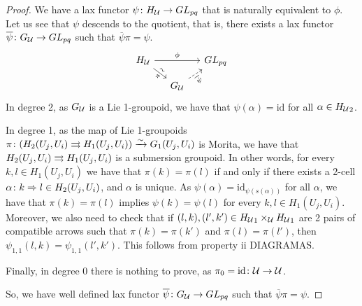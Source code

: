 \begin{proof}
We have a lax functor $\psi\colon H_{\mathcal{U}}\to GL_{pq}$ that is naturally equivalent to $\phi$.
Let us see that $\psi$ descends to the quotient, that is, there exists a lax functor $\overline\psi\colon G_{\mathcal{U}}\to GL_{pq}$ such that $\overline\psi\pi=\psi$.
\begin{equation}
\begin{tikzcd}[sep = small]
  H_\U \ar{rr}{\phi} \ar{dr}[sloped, below]{\pi}[sloped, above]{\sim} & & GL_{pq} \\
  & G_\U \ar[dashed]{ur}[sloped, below]{\overline\psi}
\end{tikzcd}
\end{equation}
In degree 2, as $G_{\mathcal{U}}$ is a Lie 1-groupoid, we have that $\psi(\alpha)=\text{id}$ for all $\alpha\in {H_{\mathcal{U}}}_2$.

In degree 1, as the map of Lie 1-groupoids $\pi\colon(H_2(U_j,U_i)\rightrightarrows H_1(U_j,U_i))\xrightarrow\sim G_1(U_j,U_i)$ is Morita, we have that $H_2(U_j,U_i)\rightrightarrows H_1(U_j,U_i)$ is a submersion groupoid.
In other words, for every $k,l \in H_1(U_j,U_i)$ we have that $\pi(k) = \pi(l)$ if and only if there exists a 2-cell $\alpha\colon k\Rightarrow l\in H_2(U_j,U_i)$, and $\alpha$ is unique.
As $\psi(\alpha)=\text{id}_{\psi(s(\alpha))}$ for all $\alpha$, we have that $\pi(k) = \pi(l)$ implies $\psi(k) = \psi(l)$ for every $k,l \in H_1(U_j,U_i)$.
Moreover, we also need to check that if $(l,k),(l',k')\in{H_{\mathcal{U}}}_1\times_{\mathcal{U}}{H_{\mathcal{U}}}_1$ are 2 pairs of compatible arrows such that $\pi(k) = \pi(k')$ and $\pi(l) = \pi(l')$, then $\psi_{1,1}(l,k) = \psi_{1,1}(l',k')$.
This follows from property ii DIAGRAMAS.

Finally, in degree 0 there is nothing to prove, as $\pi_0 = \text{id}\colon\mathcal{U}\to\mathcal{U}$.

So, we have well defined lax functor $\overline\psi\colon G_{\mathcal{U}}\to GL_{pq}$ such that $\overline\psi\pi=\psi$.









\end{proof}


